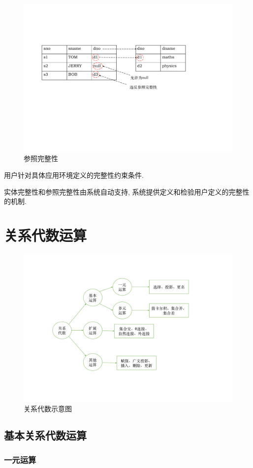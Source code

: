\begin{figure}[H]
    \centering
    \includegraphics[width=.6\textwidth]{./figure/参照完整性.pdf}
    \caption{参照完整性}
\end{figure}

\begin{definition}[用户完整性]
用户针对具体应用环境定义的完整性约束条件.
\end{definition}

实体完整性和参照完整性由系统自动支持, 系统提供定义和检验用户定义的完整性的机制.

\section{关系代数运算}

\begin{figure}[H]
    \centering
    \includegraphics[width=.6\textwidth]{./figure/关系代数.pdf}
    \caption{关系代数示意图}
\end{figure}

\subsection{基本关系代数运算}

\subsubsection{一元运算}


